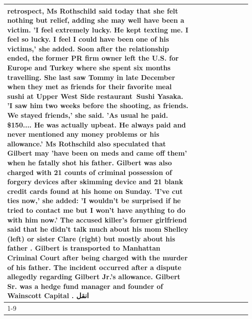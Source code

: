 \begin{table}[H]
\begin{tabular}{lllrlllll}
retrospect, Ms Rothschild said today that she felt nothing but relief, adding she may well have been a victim. 'I feel extremely lucky. He kept texting me. I feel so lucky. I feel I could have been one of his victims,' she added. Soon after the relationship ended, the former PR firm owner left the U.S. for Europe and Turkey where she spent six months  travelling. She last saw Tommy in late December when they met as friends for their favorite meal sushi at Upper West Side restaurant Sushi Yasaka. 'I saw him two weeks before the shooting, as friends. We stayed friends,' she said. 'As usual he paid. \$150.... He was actually upbeat. He always paid and never mentioned any money problems or his allowance.' Ms Rothschild also speculated that Gilbert may 'have been on meds and came off them' when he fatally shot his father. Gilbert was also charged with 21 counts of criminal possession of forgery devices after skimming device and 21 blank credit cards found at his home on Sunday. 'I've cut ties now,' she added: 'I wouldn’t be surprised if he tried to contact me but I won’t have anything to do with him now.' The accused killer's former girlfriend said that he didn't talk much about his mom Shelley (left) or sister Clare (right) but mostly about his father . Gilbert is transported to Manhattan Criminal Court  after being charged with the murder of his father. The incident occurred after a dispute allegedly regarding Gilbert Jr.'s allowance. Gilbert Sr. was a hedge fund manager and founder of Wainscott Capital . انقل \\
\cline{1-9}

\end{tabular}
\end{table}
